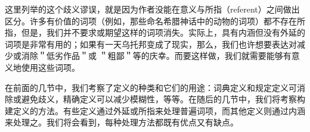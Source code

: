 这里列举的这个歧义谬误，就是因为作者没能在意义与所指（referent）之间做出区分。许多有价值的词项（例如，那些命名希腊神话中的动物的词项）都不存在所指，但是，我们并不要求或期望这样的词项消失。实际上，具有内涵但没有外延的词项是非常有用的；如果有一天乌托邦变成了现实，那么，我们也许想要表达对减少或消除＂低劣作品＂或 ＂粗鄙＂等的庆幸。而要这样做，我们就需要能够有意义地使用这些词项。

在前面的几节中，我们考察了定义的种类和它们的用途：词典定义和规定定义可消除或避免歧义，精确定义可以减少模糊性，等等。在随后的几节中，我们将考察构建定义的方法。有些定义通过外延或所指来处理普遍词项，而其他定义则通过内涵来处理之。我们将会看到，每种处理方法都既有优点又有缺点。 